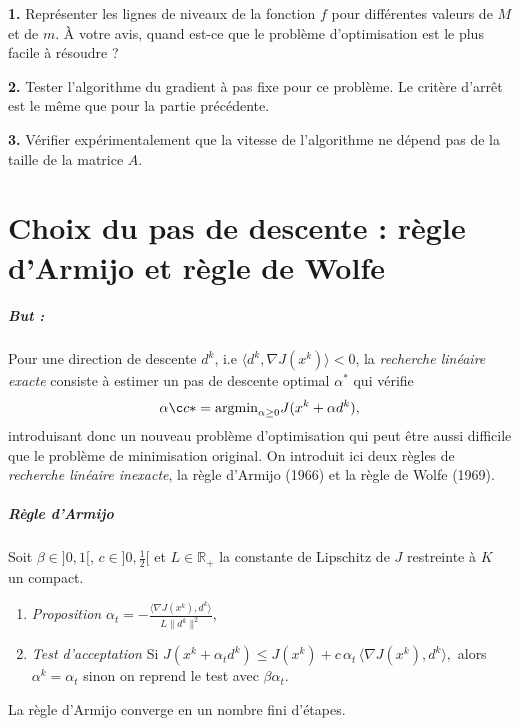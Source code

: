 \documentclass[a4paper,french,12pt]{article}
\begin{document}
\textbf{1.} Représenter les lignes de niveaux de la fonction $f$ pour différentes valeurs de $M$ et de $m$. À votre avis, quand est-ce que le problème d'optimisation est le plus facile à résoudre ?

\textbf{2.} Tester l'algorithme du gradient à pas fixe pour ce problème. Le critère d'arrêt est le même que pour la partie précédente.

\textbf{3.} Vérifier expérimentalement que la vitesse de l'algorithme ne dépend pas de la taille de la matrice $A$.
%
%
\section{Choix du pas de descente : règle d'Armijo et règle de Wolfe}
%
\subparagraph{But :} Pour une direction de descente $d^k$, i.e $\langle d^k,\nabla J(x^k)\rangle<0$, la \textit{recherche linéaire exacte}
consiste à estimer un pas de descente optimal $\alpha^*$ qui vérifie
\[
\alphaç* = \text{argmin}_{\alpha\geq 0} J(x^k + \alpha d^k),
\]
introduisant donc un nouveau problème d'optimisation qui peut être aussi difficile que le problème de minimisation original. On introduit ici deux règles de \textit{recherche linéaire inexacte}, la règle d'Armijo (1966) et la règle de Wolfe (1969).
\subparagraph{Règle d'Armijo}
Soit $\beta \in ]0,1[$, $c \in ]0, \frac{1}{2}[$ et $L \in \mathbb{R}_+$ la constante de Lipschitz de $J$ restreinte à $K$ un compact.
\begin{enumerate}
%
\item \textit{Proposition} 
$\alpha_t = -\frac{\langle \nabla J(x^k),d^k \rangle}{L \|d^k\|^2}$,
\item \textit{Test d'acceptation}
  Si $J(x^k + \alpha_t d^k) \leq J(x^k) 
+ c\, \alpha_t\, \langle \nabla J(x^k),d^k \rangle,
$ alors $\alpha^k = \alpha_t$ sinon on reprend le test avec $\beta \alpha_t$.
\end{enumerate}
La règle d'Armijo converge en un nombre fini d'étapes.
\end{document}

